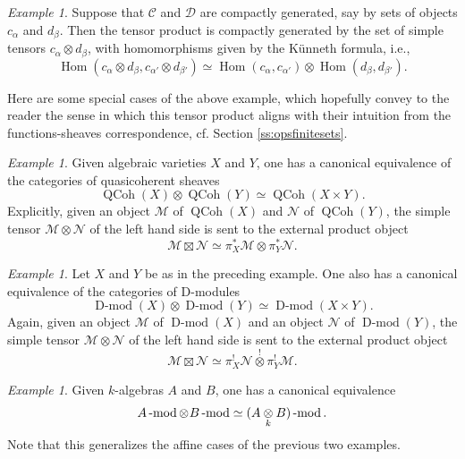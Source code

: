 \documentclass[10pt]{amsart}
\newcommand{\sM}{\mathscr{M}}
\newcommand{\on}{\operatorname}
\renewcommand{\mod}{\on{-mod}}
\newcommand{\Dmod}{\on{D-mod}}
\theoremstyle{remark}
\newtheorem{ex}[subsubsection]{Example}
\newcommand{\Hom}{\operatorname{Hom}}
\newcommand{\sN}{\mathscr{N}}
\newcommand{\sD}{\mathscr{D}}
\numberwithin{equation}{section}
\newcommand{\sC}{\mathscr{C}}
\renewcommand{\mod}{\operatorname{-mod}}
\begin{document}
\begin{ex}Suppose that $\sC$ and $\sD$ are compactly generated, say by sets of 
objects $c_\alpha$ and $d_\beta$. Then the tensor product is compactly 
generated by the set of simple tensors $c_\alpha \otimes d_\beta$, with 
homomorphisms given by the K\"{u}nneth formula, i.e., 
%
\[
\Hom( c_\alpha \otimes d_\beta, c_{\alpha'} \otimes d_{\beta'}) \simeq 
\Hom(c_\alpha, c_{\alpha'}) \otimes \Hom(d_\beta, d_{\beta'}).
\]
%	
	
\end{ex}


Here are some special cases of the above example, which hopefully convey to the 
reader the sense in which this tensor product aligns with their intuition from 
the functions-sheaves correspondence, cf. Section \ref{ss:opsfinitesets}. 


\begin{ex} Given algebraic varieties $X$ and $Y$, one has a canonical 
equivalence of the categories of quasicoherent sheaves 
	\[
	   \on{QCoh}(X) \otimes \on{QCoh}(Y) \simeq \on{QCoh}(X \times Y).
	\]
Explicitly, given an object $\sM$ of $\on{QCoh}(X)$ and $\sN$ of 
$\on{QCoh}(Y)$, the simple tensor $\sM \otimes \sN$ of the left hand side is sent to the 
external product object $$\sM \boxtimes \sN	\simeq \pi_X^* \sM 
\overset{}\otimes \pi_Y^* \sN.$$
	
	
\end{ex}


\begin{ex} Let $X$ and $Y$ be as in the preceding example. One also has a 
canonical equivalence of the categories of D-modules 
	\[
	     \Dmod(X) \otimes \Dmod(Y) \simeq \Dmod(X \times Y).
	\]
   Again, given an object $\sM$ of $\Dmod(X)$ and an object $\sN$ of 
   $\Dmod(Y)$, the simple tensor $\sM \otimes \sN$ of the left hand side is sent to the 
   external product object 
   \[
      \sM \boxtimes \sN \simeq \pi_X^! \sN \overset{!}{\otimes} \pi_Y^! \sM. 
   \] 
    
\end{ex}


\begin{ex}Given $k$-algebras $A$ and $B$, one has a canonical equivalence 
	\[
	    A\mod \otimes \hspace{.2mm} B\mod \simeq (A \underset{k} \otimes 
	    B)\mod. 
	\]
	Note that this generalizes the affine cases of the previous two examples. 
\end{ex}
\end{document}
